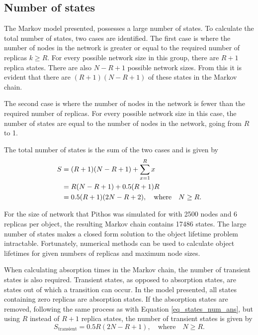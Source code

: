 \subsection{Number of states}

The Markov model presented, possesses a large number of states. To calculate the total number of states, two cases are identified. The first case is where the number of nodes in the network is greater or equal to the required number of replicas $k \geq R$. For every possible network size in this group, there are $R+1$ replica states. There are also $N - R + 1$ possible network sizes. From this it is evident that there are $(R+1)(N - R + 1)$ of these states in the Markov chain.

The second case is where the number of nodes in the network is fewer than the required number of replicas. For every possible network size in this case, the number of states are equal to the number of nodes in the network, going from $R$ to 1.

The total number of states is the sum of the two cases and is given by
%
\begin{align}
       S & = (R+1)(N - R + 1) + \sum_{x=1}^{R} x\label{eq_states_num_init}\\
         & = R(N - R + 1) + 0.5 (R + 1) R\notag\\
         & = 0.5 (R + 1) (2 N - R + 2), \quad\textrm{where}\quad N \geq R. \label{eq_states_num_ans}
\end{align}

For the size of network that Pithos was simulated for with 2500 nodes and 6 replicas per object, the resulting Markov chain contains 17486 states. The large number of states makes a closed form solution to the object lifetime problem intractable. Fortunately, numerical methods can be used to calculate object lifetimes for given numbers of replicas and maximum node sizes.

When calculating absorption times in the Markov chain, the number of transient states is also required. Transient states, as opposed to absorption states, are states out of which a transition can occur. In the model presented, all states containing zero replicas are absorption states. If the absorption states are removed, following the same process as with Equation \eqref{eq_states_num_ans}, but using $R$ instead of $R+1$ replica states, the number of transient states is given by
%
\begin{equation}
S_\textrm{transient} = 0.5 R (2 N - R + 1), \quad\textrm{where}\quad N \geq R. \label{eq_transient_states_num}
\end{equation}

